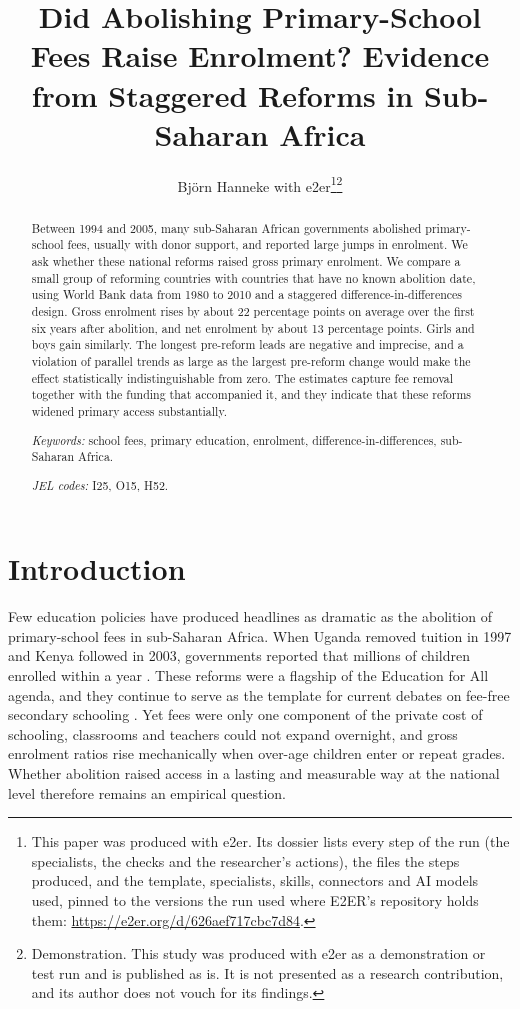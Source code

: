 \documentclass[12pt]{article}
\title{Did Abolishing Primary-School Fees Raise Enrolment? Evidence from Staggered Reforms in Sub-Saharan Africa}
\author{Björn Hanneke with e2er\thanks{This paper was produced with e2er. Its dossier lists every step of the run (the specialists, the checks and the researcher's actions), the files the steps produced, and the template, specialists, skills, connectors and AI models used, pinned to the versions the run used where E2ER's repository holds them: \url{https://e2er.org/d/626aef717cbc7d84}.}\thanks{Demonstration. This study was produced with e2er as a demonstration or test run and is published as is. It is not presented as a research contribution, and its author does not vouch for its findings.}}
\date{}
\begin{document}
\maketitle

\begin{abstract}
Between 1994 and 2005, many sub-Saharan African governments abolished primary-school fees, usually with donor support, and reported large jumps in enrolment. We ask whether these national reforms raised gross primary enrolment. We compare a small group of reforming countries with countries that have no known abolition date, using World Bank data from 1980 to 2010 and a staggered difference-in-differences design. Gross enrolment rises by about 22 percentage points on average over the first six years after abolition,
and net enrolment by about 13 percentage points.
Girls and boys gain similarly. The longest pre-reform leads are negative and imprecise, and a violation of parallel trends as large as the largest pre-reform change would make the effect statistically indistinguishable from zero. The estimates capture fee removal together with the funding that accompanied it, and they indicate that these reforms widened primary access substantially.

\medskip
\noindent\textit{Keywords:} school fees, primary education, enrolment, difference-in-differences, sub-Saharan Africa.

\noindent\textit{JEL codes:} I25, O15, H52.
\end{abstract}

\section{Introduction}

Few education policies have produced headlines as dramatic as the abolition of primary-school fees in sub-Saharan Africa. When Uganda removed tuition in 1997 and Kenya followed in 2003, governments reported that millions of children enrolled within a year \citep{kan2020evaluating,oketch2010free}. These reforms were a flagship of the Education for All agenda, and they continue to serve as the template for current debates on fee-free secondary schooling \citep{gruijters2024secondary}. Yet fees were only one component of the private cost of schooling, classrooms and teachers could not expand overnight, and gross enrolment ratios rise mechanically when over-age children enter or repeat grades. Whether abolition raised access in a lasting and measurable way at the national level therefore remains an empirical question.
\end{document}
